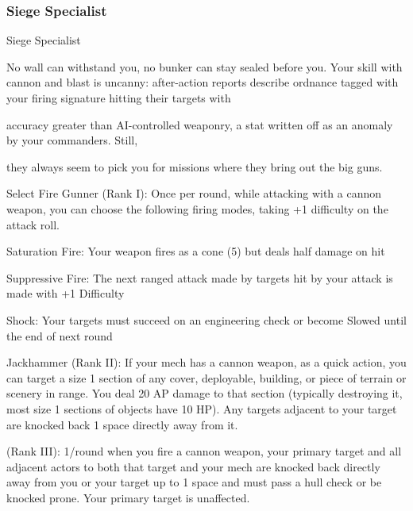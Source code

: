 \subsubsection{Siege Specialist}

                                             Siege Specialist

No wall can withstand you, no bunker can stay sealed before you. Your skill with cannon and blast is
uncanny: after-action reports describe ordnance tagged with your firing signature hitting their targets with

accuracy greater than AI-controlled weaponry, a stat written off as an anomaly by your commanders. Still,

they always seem to pick you for missions where they bring out the big guns.

Select Fire Gunner (Rank I): Once per round, while attacking with a cannon weapon, you can
choose the following firing modes, taking +1 difficulty on the attack roll.

         Saturation Fire: Your weapon fires as a cone (5) but deals half damage on hit





         Suppressive Fire: The next ranged attack made by targets hit by your attack is made with
         +1 Difficulty

         Shock: Your targets must succeed on an engineering check or become Slowed until the
         end of next round

Jackhammer (Rank II): If your mech has a cannon weapon, as a quick action, you can target a
size 1 section of any cover, deployable, building, or piece of terrain or scenery in range. You deal
20 AP damage to that section (typically destroying it, most size 1 sections of objects have 10
HP). Any targets adjacent to your target are knocked back 1 space directly away from it.

(Rank III): 1/round when you fire a cannon weapon, your primary target and all adjacent actors to
both that target and your mech are knocked back directly away from you or your target up to 1
space and must pass a hull check or be knocked prone. Your primary target is unaffected.
